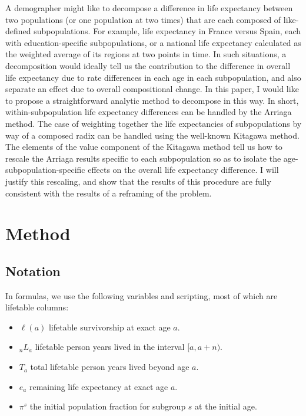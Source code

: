 \documentclass[sn-apa,pdflatex]{sn-jnl}
\theoremstyle{remark}
\theoremstyle{definition}
\begin{document}
A demographer might like to decompose a difference in life expectancy
between two populations (or one population at two times) that are each
composed of like-defined subpopulations. For example, life expectancy in
France versus Spain, each with education-specific subpopulations, or a
national life expectancy calculated as the weighted average of its
regions at two points in time. In such situations, a decomposition would
ideally tell us the contribution to the difference in overall life
expectancy due to rate differences in each age in each subpopulation,
and also separate an effect due to overall compositional change. In this
paper, I would like to propose a straightforward analytic method to
decompose in this way. In short, within-subpopulation life expectancy
differences can be handled by the Arriaga method. The case of weighting
together the life expectancies of subpopulations by way of a composed
radix can be handled using the well-known Kitagawa method. The elements
of the value component of the Kitagawa method tell us how to rescale the
Arriaga results specific to each subpopulation so as to isolate the
age-subpopulation-specific effects on the overall life expectancy
difference. I will justify this rescaling, and show that the results of
this procedure are fully consistent with the results of a
\citet{horiuchi2008decomposition} reframing of the problem.

\hypertarget{method}{%
\section{Method}\label{method}}

\hypertarget{notation}{%
\subsection{Notation}\label{notation}}

In formulas, we use the following variables and scripting, most of which
are lifetable columns:

\begin{itemize}

\item{$\ell(a)$} lifetable survivorship at exact age $a$.

\item{${}_nL_a$} lifetable person years lived in the interval $[a,a+n)$.

\item{$T_a$} total lifetable person years lived beyond age $a$.

\item{$e_a$} remaining life expectancy at exact age $a$.

\item{$\pi^s$} the initial population fraction for subgroup $s$ at the initial age. 
\end{itemize}
\end{document}
